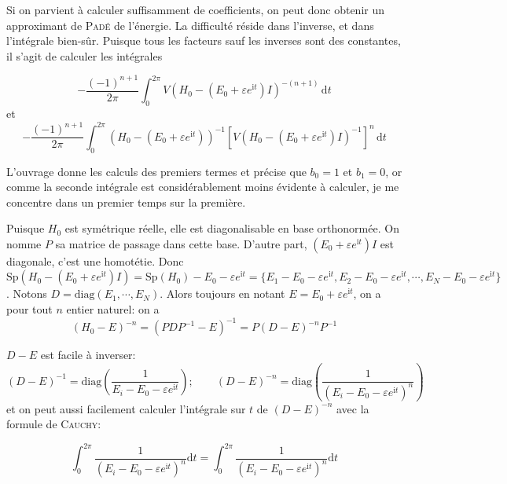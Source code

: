 \documentclass[svgnames,dvipsnames,a4paper,10pt,french]{report}
\begin{document}
\begin{appendices}
Si on parvient à calculer suffisamment de coefficients, on peut donc obtenir un approximant  de \textsc{Padé} de l'énergie. La difficulté réside dans l'inverse, et dans l'intégrale bien-sûr. Puisque tous les facteurs sauf les inverses sont des constantes, il s'agit de calculer les intégrales

\begin{equation}
    -\frac{(-1)^{n+1}}{2\pi} \int_{0}^{2\pi}  V(H_0-(E_0+\varepsilon e^{\mathrm{i}t})I)^{-(n+1)} \, \mathrm{d}t
\end{equation}
et
\begin{equation}
    -\frac{(-1)^{n+1}}{2 \pi} \int_{0}^{2\pi} (H_0-(E_0+\varepsilon e^{\mathrm{i}t}))^{-1} [V(H_0-(E_0+\varepsilon e^{\mathrm{i}t})I)^{-1}]^n  \, \mathrm{d}t
\end{equation}
 

L'ouvrage donne les calculs des premiers termes et précise que $b_0=1$ et $b_1 = 0$, or comme la seconde intégrale est considérablement moins évidente à calculer, je me concentre dans un premier temps sur la première.

Puisque $H_0$ est symétrique réelle, elle est diagonalisable en base orthonormée. On nomme $P$ sa matrice de passage dans cette base. D'autre part, $(E_0+\varepsilon e^{\mathrm{i}t})I$ est diagonale, c'est une homotétie. Donc $\text{Sp}(H_0-(E_0+\varepsilon e^{\mathrm{i}t})I) = \text{Sp}(H_0) -E_0-\varepsilon e^{\mathrm{i}t} = \{E_1 - E_0-\varepsilon e^{\mathrm{i}t}, E_2 -E_0-\varepsilon e^{\mathrm{i}t}, \cdots, E_N-E_0-\varepsilon e^{\mathrm{i}t}\}$. Notons $D = \text{diag}(E_1, \cdots, E_N)$.
Alors toujours en notant $E=E_0+\varepsilon e^{\mathrm{i}t}$, on a pour tout $n$ entier naturel: on a
\begin{equation}
    (H_0-E)^{-n} = (PDP^{-1}-E)^{-1} = P(D-E)^{-n}P^{-1}
\end{equation}


$D-E$ est facile à inverser:
\begin{equation}
    (D-E)^{-1} = \text{diag}\left( \frac{1}{E_i-E_0-\varepsilon e^{\mathrm{i}t}}\right) ; \qquad (D-E)^{-n} = \text{diag}\left( \frac{1}{(E_i-E_0-\varepsilon e^{\mathrm{i}t})^n}\right)
\end{equation}
 et on peut aussi facilement calculer l'intégrale sur $t$ de $(D-E)^{-n}$ avec la formule de \textsc{Cauchy}:
 
 
 \begin{equation}
     \int_0^{2\pi} \frac{1}{(E_i-E_0-\varepsilon e^{\mathrm{i}t})^n} \mathrm{d}t = \int_0^{2\pi} \frac{1}{(E_i-E_0-\varepsilon e^{\mathrm{i}t})^n} \mathrm{d}t
 \end{equation}
\end{appendices}

\nocite{*}
 
\end{document}
